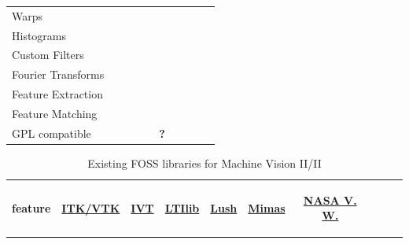 \documentclass[12pt,a4paper,oneside,openright]{book}
\newcommand{\tick}{\ding{52}} %
\newcommand{\qqqq}{\textbf{?}}
\newcommand{\xxxx}{}
\begin{document}
\begin{CJK}{UTF8}{}
\begin{table}[htbp]
\begin{center}
\begin{tabular}{l|ccccccccc}
      Warps                & \xxxx & \xxxx & \xxxx & \tick & \xxxx & \xxxx & \tick & \xxxx & \tick \\
      Histograms           & \xxxx & \xxxx & \tick & \xxxx & \xxxx & \tick & \xxxx & \tick & \tick \\
      Custom Filters       & \tick & \xxxx & \xxxx & \tick & \xxxx & \tick & \tick & \tick & \tick \\
      Fourier Transforms   & \tick & \xxxx & \xxxx & \xxxx & \xxxx & \xxxx & \xxxx & \xxxx & \tick \\
      Feature Extraction   & \tick & \xxxx & \xxxx & \tick & \tick & \tick & \tick & \tick & \tick \\
      Feature Matching     & \tick & \xxxx & \xxxx & \xxxx & \tick & \xxxx & \xxxx & \xxxx & \xxxx \\
      \acs{GPL} compatible & \tick & \tick & \tick & \tick & \qqqq & \tick & \tick & \tick & \tick \\\bottomrule
    \end{tabular}
  \end{center}
\end{table}
\begin{table}[htbp]
  \begin{center}
    \caption{Existing \acs{FOSS} libraries for Machine Vision II/II\label{tbl:foss2}}\vspace{1em}
    \begin{tabular}{l|ccccccccc}\toprule
      \textbf{feature} &
      \begin{sideways}\href{http://www.itk.org/Insight/Doxygen/html/index.html}{\textbf{ITK/VTK}}\end{sideways} &
      \begin{sideways}\href{http://ivt.sourceforge.net/}{\textbf{IVT}}\end{sideways} &
      \begin{sideways}\href{http://ltilib.sourceforge.net/doc/homepage/index.shtml}{\textbf{LTIlib}}\end{sideways} &
      \begin{sideways}\href{http://lush.sourceforge.net/}{\textbf{Lush}}\end{sideways} &
      \begin{sideways}\href{http://vision.eng.shu.ac.uk/mediawiki/index.php/Mimas}{\textbf{Mimas}}\end{sideways} &
      \begin{sideways}\href{http://ti.arc.nasa.gov/projects/visionworkbench/}{\textbf{NASA V. W.}}\end{sideways} &

\end{tabular}
\end{center}
\end{table}
\end{CJK}
\end{document}
